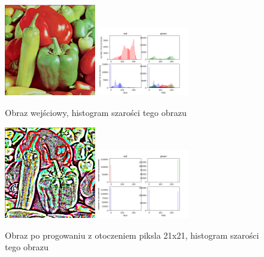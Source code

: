 \documentclass[final,a4paper,openany,12pt]{mwbk}
\begin{document}
\begin{figure}[H]
	\begin{center}
		\includegraphics[width=0.35\textwidth]{peppers_color}
		\includegraphics[width=0.35\textwidth]{peppers_color_histogram}
	\end{center}
	\caption{Obraz wejściowy, histogram szarości tego obrazu}
\end{figure}

\begin{figure}[H]
	\begin{center}
		\includegraphics[width=0.35\textwidth]{peppers_color_localSingleThreshold_result}
		\includegraphics[width=0.35\textwidth]{peppers_color_localSingleThreshold_histogram}
	\end{center}
	\caption{Obraz po progowaniu z otoczeniem piksla 21x21, histogram szarości tego obrazu}
\end{figure}
\end{document}
